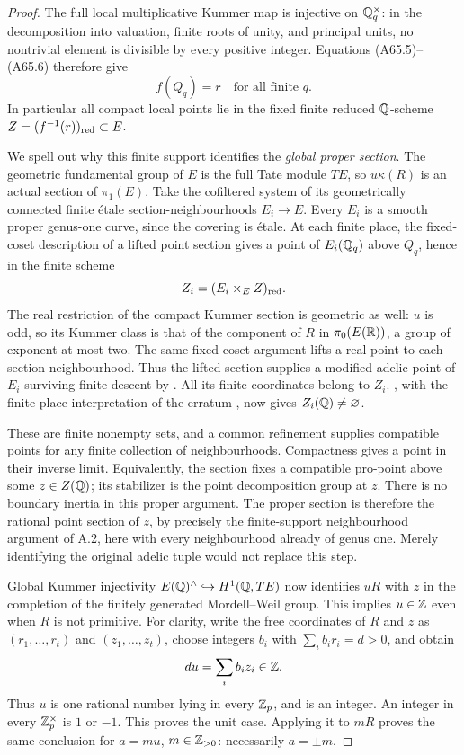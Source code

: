\begin{proof}
The full local multiplicative Kummer map is injective
on $\mathbb Q_q^\times$: in the decomposition into valuation,
finite roots of unity, and principal units, no nontrivial
element is divisible by every positive integer.
Equations (A65.5)--(A65.6) therefore give
\[
 f(Q_q)=r\quad\text{for all finite }q.
 \tag{A65.7}
\]
In particular all compact local points lie in the fixed
finite reduced $\mathbb Q$-scheme $Z=(f^{-1}(r))_{\rm red}\subset E$.

We spell out why this finite support identifies the
\emph{global proper section}. The geometric fundamental
group of $E$ is the full Tate module $T E$, so
$u\kappa(R)$ is an actual section of $\pi_1(E)$.
Take the cofiltered system of its geometrically connected
finite \'{e}tale section-neighbourhoods $E_i\to E$.
Every $E_i$ is a smooth proper genus-one curve, since
the covering is \'{e}tale. At each finite place, the
fixed-coset description of a lifted point section gives
a point of $E_i(\mathbb Q_q)$ above $Q_q$, hence in the finite
scheme
\[
 Z_i=(E_i\times_E Z)_{\rm red}.
\]
The real restriction of the compact Kummer section is
geometric as well: $u$ is odd, so its Kummer class
is that of the component of $R$ in $\pi_0(E(\mathbb R))$,
a group of exponent at most two.
The same fixed-coset argument lifts a
real point to each section-neighbourhood. Thus the
lifted section supplies a modified adelic point of
$E_i$ surviving finite descent by
\citet[Theorem~2.1]{AMHarariStix2012}. All its finite
coordinates belong to $Z_i$.
\citet[Theorem~8.2]{AMStoll2007}, with the finite-place
interpretation of the erratum \citep{AMStollErrata2017}, now gives
$Z_i(\mathbb Q)\ne\varnothing$.

These are finite nonempty sets, and a common refinement
supplies compatible points for any finite collection
of neighbourhoods. Compactness gives a point in their
inverse limit. Equivalently, the section fixes a
compatible pro-point above some $z\in Z(\mathbb Q)$; its
stabilizer is the point decomposition group at $z$.
There is no boundary inertia in this proper argument.
The proper section is therefore the rational point
section of $z$, by precisely the finite-support
neighbourhood argument of A.2, here with every
neighbourhood already of genus one. Merely identifying
the original adelic tuple would not replace this step.

Global Kummer injectivity
$E(\mathbb Q)^\wedge\hookrightarrow H^1(\mathbb Q,T E)$ now identifies
$uR$ with $z$ in the completion of the finitely generated
Mordell--Weil group. This implies $u\in\mathbb Z$ even when
$R$ is not primitive. For clarity, write the free
coordinates of $R$ and $z$ as
$(r_1,\ldots,r_t)$ and $(z_1,\ldots,z_t)$, choose
integers $b_i$ with $\sum_i b_i r_i=d>0$, and obtain
\[
 du=\sum_i b_i z_i\in\mathbb Z.
\]
Thus $u$ is one rational number lying in every $\mathbb Z_p$,
and is an integer. An integer in every
$\mathbb Z_p^\times$ is $1$ or $-1$. This proves the unit
case. Applying it to $mR$ proves the same conclusion
for $a=mu$, $m\in\mathbb Z_{>0}$: necessarily $a=\pm m$.


\end{proof}
